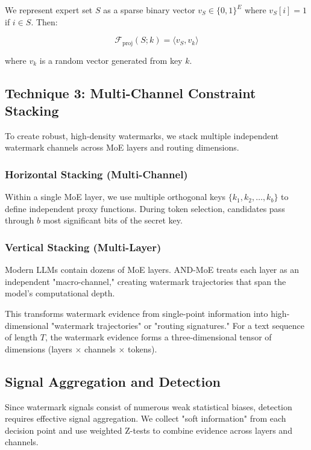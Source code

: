 \documentclass[letterpaper,twocolumn,10pt]{article}
\begin{document}
We represent expert set $S$ as a sparse binary vector $v_S \in \{0,1\}^E$ where $v_S[i] = 1$ if $i \in S$. Then:

\begin{equation}
\mathcal{F}_{\text{proj}}(S; k) = \langle v_S, v_k \rangle
\end{equation}

where $v_k$ is a random vector generated from key $k$.

\subsection{Technique 3: Multi-Channel Constraint Stacking}

To create robust, high-density watermarks, we stack multiple independent watermark channels across MoE layers and routing dimensions.

\subsubsection{Horizontal Stacking (Multi-Channel)}

Within a single MoE layer, we use multiple orthogonal keys $\{k_1, k_2, \ldots, k_b\}$ to define independent proxy functions. During token selection, candidates pass through $b$ most significant bits of the secret key.

\subsubsection{Vertical Stacking (Multi-Layer)}

Modern LLMs contain dozens of MoE layers. AND-MoE treats each layer as an independent "macro-channel," creating watermark trajectories that span the model's computational depth.

This transforms watermark evidence from single-point information into high-dimensional "watermark trajectories" or "routing signatures." For a text sequence of length $T$, the watermark evidence forms a three-dimensional tensor of dimensions (layers × channels × tokens).

\subsection{Signal Aggregation and Detection}

Since watermark signals consist of numerous weak statistical biases, detection requires effective signal aggregation. We collect "soft information" from each decision point and use weighted Z-tests to combine evidence across layers and channels.
\end{document}
